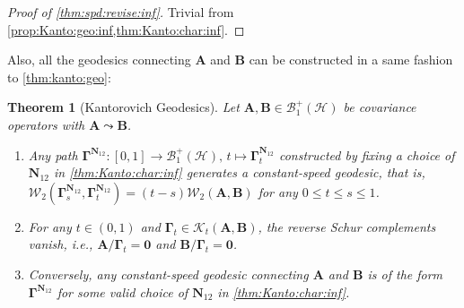 \documentclass[noinfoline]{imsart}\setcounter{tocdepth}{2}
\newcommand{\m}[1]{\mathbf{#1}} %
\renewcommand{\c}[1]{\mathcal{#1}} %
\theoremstyle{plain}
\newtheorem{theorem}{Theorem}[section]
\begin{document}
\begin{proof}[Proof of \cref{thm:spd:revise:inf}]
Trivial from \cref{prop:Kanto:geo:inf,thm:Kanto:char:inf}.
\end{proof}




Also, all the geodesics connecting $\m{A}$ and $\m{B}$ can be constructed in a same fashion to \cref{thm:kanto:geo}:

\begin{theorem}[Kantorovich Geodesics]\label{thm:kanto:geo:inf}
Let $\m{A}, \m{B} \in \c{B}_{1}^{+}(\c{H})$ be covariance operators with $\m{A} \leadsto \m{B}$.
\begin{enumerate}[leftmargin = *]
\item Any path $\m{\Gamma}^{\m{N}_{12}}: [0, 1] \to \c{B}_{1}^{+}(\c{H}), \, t \mapsto \m{\Gamma}_{t}^{\m{N}_{12}}$ constructed by fixing a choice of $\m{N}_{12}$ in \cref{thm:Kanto:char:inf} generates a constant-speed geodesic, that is, $\c{W}_{2}(\m{\Gamma}_{s}^{\m{N}_{12}}, \m{\Gamma}_{t}^{\m{N}_{12}}) = (t-s) \c{W}_{2}(\m{A}, \m{B})$ for any $0 \le t \le s \le 1$.
\item For any $t \in (0, 1)$ and $\m{\Gamma}_{t} \in \c{K}_{t}(\m{A}, \m{B})$, the \emph{reverse} Schur complements vanish, i.e., $\m{A}/\m{\Gamma}_{t} = \m{0}$ and $\m{B}/\m{\Gamma}_{t} = \m{0}$.
\item Conversely, any constant-speed geodesic connecting $\m{A}$ and $\m{B}$ is of the form $\m{\Gamma}^{\m{N}_{12}}$ for some valid choice of $\m{N}_{12}$ in \cref{thm:Kanto:char:inf}.
\end{enumerate}
\end{theorem}
\end{document}
